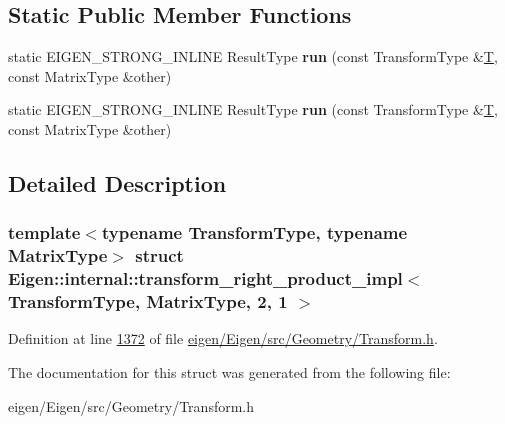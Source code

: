 \subsection*{Static Public Member Functions}
\begin{DoxyCompactItemize}
\item 
\mbox{\label{struct_eigen_1_1internal_1_1transform__right__product__impl_3_01_transform_type_00_01_matrix_type_00_012_00_011_01_4_a8d7df9c44748a733992415d869a6127d}} 
static E\+I\+G\+E\+N\+\_\+\+S\+T\+R\+O\+N\+G\+\_\+\+I\+N\+L\+I\+NE Result\+Type {\bfseries run} (const Transform\+Type \&\hyperlink{group___sparse_core___module}{T}, const Matrix\+Type \&other)
\item 
\mbox{\label{struct_eigen_1_1internal_1_1transform__right__product__impl_3_01_transform_type_00_01_matrix_type_00_012_00_011_01_4_a8d7df9c44748a733992415d869a6127d}} 
static E\+I\+G\+E\+N\+\_\+\+S\+T\+R\+O\+N\+G\+\_\+\+I\+N\+L\+I\+NE Result\+Type {\bfseries run} (const Transform\+Type \&\hyperlink{group___sparse_core___module}{T}, const Matrix\+Type \&other)
\end{DoxyCompactItemize}


\subsection{Detailed Description}
\subsubsection*{template$<$typename Transform\+Type, typename Matrix\+Type$>$\newline
struct Eigen\+::internal\+::transform\+\_\+right\+\_\+product\+\_\+impl$<$ Transform\+Type, Matrix\+Type, 2, 1 $>$}



Definition at line \hyperlink{eigen_2_eigen_2src_2_geometry_2_transform_8h_source_l01372}{1372} of file \hyperlink{eigen_2_eigen_2src_2_geometry_2_transform_8h_source}{eigen/\+Eigen/src/\+Geometry/\+Transform.\+h}.



The documentation for this struct was generated from the following file\+:\begin{DoxyCompactItemize}
\item 
eigen/\+Eigen/src/\+Geometry/\+Transform.\+h\end{DoxyCompactItemize}
